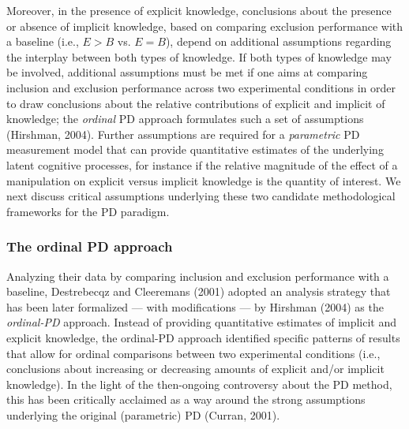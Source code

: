 \documentclass[man]{apa6}
\theoremstyle{definition}
\theoremstyle{definition}
\theoremstyle{definition}
\theoremstyle{remark}
\begin{document}
Moreover, in the presence of explicit knowledge, conclusions about the
presence or absence of implicit knowledge, based on comparing exclusion
performance with a baseline (i.e., \(E>B\) vs. \(E=B\)), depend on
additional assumptions regarding the interplay between both types of
knowledge. If both types of knowledge may be involved, additional
assumptions must be met if one aims at comparing inclusion and exclusion
performance across two experimental conditions in order to draw
conclusions about the relative contributions of explicit and implicit of
knowledge; the \emph{ordinal} PD approach formulates such a set of
assumptions (Hirshman, 2004). Further assumptions are required for a
\emph{parametric} PD measurement model that can provide quantitative
estimates of the underlying latent cognitive processes, for instance if
the relative magnitude of the effect of a manipulation on explicit
versus implicit knowledge is the quantity of interest. We next discuss
critical assumptions underlying these two candidate methodological
frameworks for the PD paradigm.

\subsubsection{The ordinal PD approach}\label{the-ordinal-pd-approach}

Analyzing their data by comparing inclusion and exclusion performance
with a baseline, Destrebecqz and Cleeremans (2001) adopted an analysis
strategy that has been later formalized --- with modifications --- by
Hirshman (2004) as the \emph{ordinal-PD} approach. Instead of providing
quantitative estimates of implicit and explicit knowledge, the
ordinal-PD approach identified specific patterns of results that allow
for ordinal comparisons between two experimental conditions (i.e.,
conclusions about increasing or decreasing amounts of explicit and/or
implicit knowledge). In the light of the then-ongoing controversy about
the PD method, this has been critically acclaimed as a way around the
strong assumptions underlying the original (parametric) PD (Curran,
2001).
\end{document}
